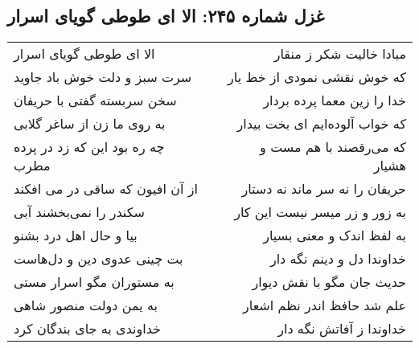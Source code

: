 \begin{center}
\section*{غزل شماره ۲۴۵: الا ای طوطی گویای اسرار}
\label{sec:sh245}
\begin{longtable}{l p{0.5cm} r}
الا ای طوطی گویای اسرار
&&
مبادا خالیت شکر ز منقار
\\
سرت سبز و دلت خوش باد جاوید
&&
که خوش نقشی نمودی از خط یار
\\
سخن سربسته گفتی با حریفان
&&
خدا را زین معما پرده بردار
\\
به روی ما زن از ساغر گلابی
&&
که خواب آلوده‌ایم ای بخت بیدار
\\
چه ره بود این که زد در پرده مطرب
&&
که می‌رقصند با هم مست و هشیار
\\
از آن افیون که ساقی در می افکند
&&
حریفان را نه سر ماند نه دستار
\\
سکندر را نمی‌بخشند آبی
&&
به زور و زر میسر نیست این کار
\\
بیا و حال اهل درد بشنو
&&
به لفظ اندک و معنی بسیار
\\
بت چینی عدوی دین و دل‌هاست
&&
خداوندا دل و دینم نگه دار
\\
به مستوران مگو اسرار مستی
&&
حدیث جان مگو با نقش دیوار
\\
به یمن دولت منصور شاهی
&&
علم شد حافظ اندر نظم اشعار
\\
خداوندی به جای بندگان کرد
&&
خداوندا ز آفاتش نگه دار
\\
\end{longtable}
\end{center}
